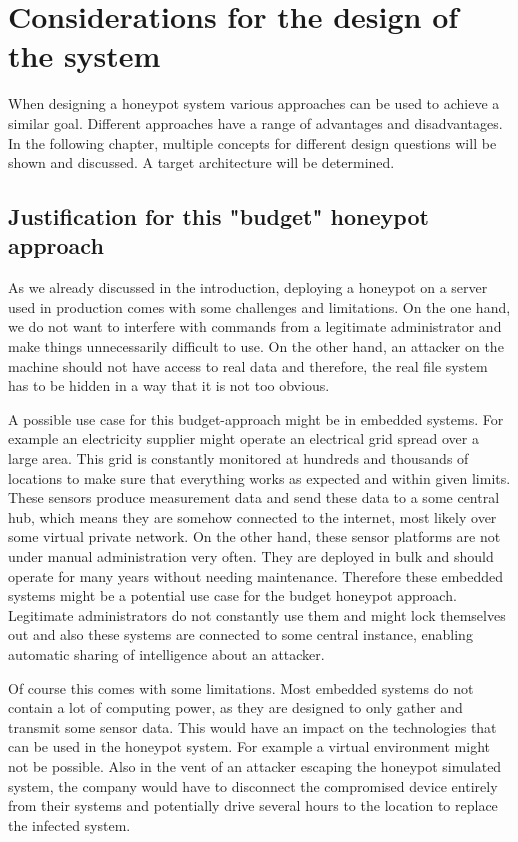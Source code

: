 \chapter{Considerations for the design of the system}
\label{chap:basics}

When designing a honeypot system various approaches can be used to achieve a similar goal. 
Different approaches have a range of advantages and disadvantages.
In the following chapter, multiple concepts for different design questions will be shown and discussed.
A target architecture will be determined.

\section{Justification for this "budget" honeypot approach}\label{sec:budget}
As we already discussed in the introduction, deploying a honeypot on a server used in production comes with some challenges and limitations. On the one hand, we do not want to interfere with commands from a legitimate administrator and make things unnecessarily difficult to use. On the other hand, an attacker on the machine should not have access to real data and therefore, the real file system has to be hidden in a way that it is not too obvious.

A possible use case for this budget-approach might be in embedded systems. For example an electricity supplier might operate an electrical grid spread over a large area. This grid is constantly monitored at hundreds and thousands of locations to make sure that everything works as expected and within given limits. These sensors produce measurement data and send these data to a some central hub, which means they are somehow connected to the internet, most likely over some virtual private network.
On the other hand, these sensor platforms are not under manual administration very often. They are deployed in bulk and should operate for many years without needing maintenance. Therefore these embedded systems might be a potential use case for the budget honeypot approach. Legitimate administrators do not constantly use them and might lock themselves out and also these systems are connected to some central instance, enabling automatic sharing of intelligence about an attacker.

Of course this comes with some limitations. Most embedded systems do not contain a lot of computing power, as they are designed to only gather and transmit some sensor data. This would have an impact on the technologies that can be used in the honeypot system. For example a virtual environment might not be possible. Also in the vent of an attacker escaping the honeypot simulated system, the company would have to disconnect the compromised device entirely from their systems and potentially drive several hours to the location to replace the infected system.

